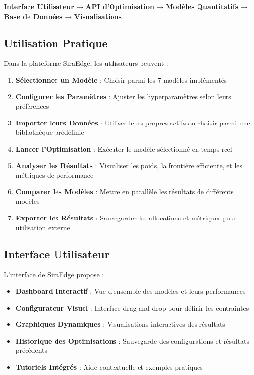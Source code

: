 \documentclass[11pt,a4paper]{article}
\begin{document}
\begin{center}
\begin{tcolorbox}[title=Architecture SiraEdge - Module d'Optimisation]
\textbf{Interface Utilisateur} → \textbf{API d'Optimisation} → \textbf{Modèles Quantitatifs} → \textbf{Base de Données} → \textbf{Visualisations}
\end{tcolorbox}
\end{center}

\subsection{Utilisation Pratique}
Dans la plateforme SiraEdge, les utilisateurs peuvent :

\begin{enumerate}
\item \textbf{Sélectionner un Modèle} : Choisir parmi les 7 modèles implémentés
\item \textbf{Configurer les Paramètres} : Ajuster les hyperparamètres selon leurs préférences
\item \textbf{Importer leurs Données} : Utiliser leurs propres actifs ou choisir parmi une bibliothèque prédéfinie
\item \textbf{Lancer l'Optimisation} : Exécuter le modèle sélectionné en temps réel
\item \textbf{Analyser les Résultats} : Visualiser les poids, la frontière efficiente, et les métriques de performance
\item \textbf{Comparer les Modèles} : Mettre en parallèle les résultats de différents modèles
\item \textbf{Exporter les Résultats} : Sauvegarder les allocations et métriques pour utilisation externe
\end{enumerate}

\subsection{Interface Utilisateur}
L'interface de SiraEdge propose :

\begin{itemize}
\item \textbf{Dashboard Interactif} : Vue d'ensemble des modèles et leurs performances
\item \textbf{Configurateur Visuel} : Interface drag-and-drop pour définir les contraintes
\item \textbf{Graphiques Dynamiques} : Visualisations interactives des résultats
\item \textbf{Historique des Optimisations} : Sauvegarde des configurations et résultats précédents
\item \textbf{Tutoriels Intégrés} : Aide contextuelle et exemples pratiques
\end{itemize}
\end{document}
